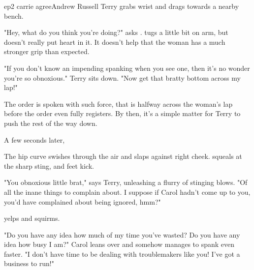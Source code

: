 \documentclass{book}
\begin{document}
\begin{childnode}{ep2 carrie agree}{Andrew Russell}
    Terry grabs \names{} wrist and drags \himher{} towards a nearby bench. 

    "Hey, what do you think you're doing?" asks \name{}. \HeShe{} tugs a little bit on \hisher{} arm, but doesn't really put \hisher{} heart in it. It doesn't help that the woman has a much
    stronger grip than \name{} expected.

    "If you don't know an impending spanking when you see one, then it's no wonder you're so obnoxious." Terry sits down. "Now get that bratty bottom across my lap!"

    The order is spoken with such force, that \name{} is halfway across the woman's lap before the order even fully registers. By then, it's a simple matter for Terry to push \himher{} the rest of
    the way down.

    A few seconds later, \names{}  
    
    The hip curve swishes through the air and slaps against \names{} 
    right cheek. \name{} squeals at the sharp sting, and \hisher{} feet kick.

    "You obnoxious little brat," says Terry, unleashing a flurry of stinging blows. "Of all the inane things to complain about. I suppose if Carol hadn't come up to you, you'd have complained about
     being ignored, hmm?"

     \name{} yelps and squirms.

     "Do you have any idea how much of my time you've wasted? Do you have any idea how busy I am?" Carol leans over and somehow manages to spank \name{} even faster. "I don't have time to be 
     dealing with troublemakers like you! I've got a business to run!"


\end{childnode}
\end{document}
